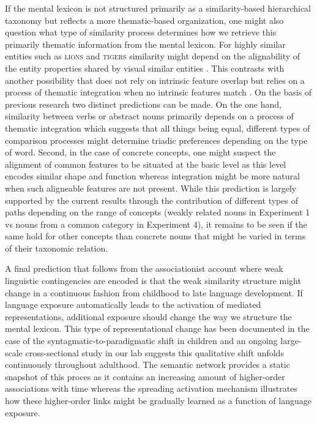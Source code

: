 \documentclass[doc]{apa6}
\newcommand{\stimulus}[1]{\textsc{#1}}
\begin{document}
If the mental lexicon is not structured primarily as a similarity-based hierarchical taxonomy but reflects a more thematic-based organization, one might also question what type of similarity process determines how we retrieve this primarily thematic information from the mental lexicon.
For highly similar entities such as \stimulus{lions} and \stimulus{tigers} similarity might depend on the alignability of the entity properties shared by visual similar entities \parencite{Markman1993}. This contrasts with another possibility that does not rely on intrinsic feature overlap but relies on a process of thematic integration when no intrinsic features match \parencite{WiemerHastingsXu2003,Wisniewski1999,Lin2001}.  On the basis of previous research two distinct predictions can be made. On the one hand, similarity between verbs or abstract nouns primarily depends on a process of thematic integration \parencite{WiemerHastingsXu2003} which suggests that all things being equal, different types of comparison processes might determine triadic preferences depending on the type of word.
Second, in the case of concrete concepts, one might suspect the alignment of common features to be situated at the basic level as this level encodes similar shape and function \parencite{Rosch1976a} whereas integration might be more natural when such aligneable features are not present.
While this prediction is largely supported by the current results through the contribution of different types of paths depending on the range of concepts (weakly related nouns in Experiment 1 vs nouns from a common category in Experiment 4), it remains to be seen if the same hold for other concepts than concrete nouns that might be varied in terms of their taxonomic relation.


A final prediction that follows from the associationist account where weak linguistic contingencies are encoded is that the weak similarity structure might change in a continuous fashion from childhood to late language development. If language exposure automatically leads to the activation of mediated representations, additional exposure should change the way we structure the mental lexicon. This type of representational change has been documented in the case of the syntagmatic-to-paradigmatic shift in children \parencite{Ervin1961} and an ongoing large-scale cross-sectional study in our lab suggests this qualitative shift unfolds continuously throughout adulthood.
 The semantic network provides a static snapshot of this proces as it contains an increasing amount of higher-order associations with time whereas the spreading activation mechanism illustrates how these higher-order links might be gradually learned as a function of language exposure.
\end{document}
